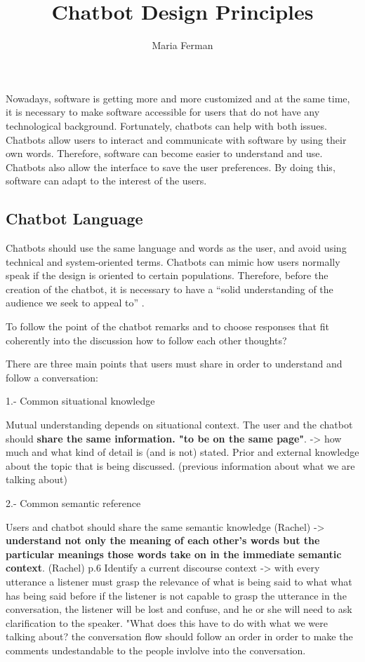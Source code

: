 \documentclass[a4paper,10pt]{article}
\title{Chatbot Design Principles}
\author{Maria Ferman}
\begin{document}
\maketitle

Nowadays, software is getting more and more customized and at the same time, it is necessary to make software accessible for users that do not have any technological background. Fortunately, chatbots can help with both issues. Chatbots allow users to interact and communicate with software by using their own words. Therefore, software can become easier to understand and use. Chatbots also allow the interface to save the user preferences. By doing this, software can adapt to the interest of the users.  

\subsection*{Chatbot Language}

Chatbots should use the same language and words as the user, and avoid using technical and system-oriented terms. Chatbots can mimic how users normally speak if the design is oriented to certain populations. Therefore, before the creation of the chatbot, it is necessary to have a ``solid understanding of the audience we seek to appeal to”  \cite{HeuristicsWebPage}. 

To follow the point of the chatbot remarks and to choose responses that fit coherently into the discussion 
how to follow each other thoughts?

There are three main points that users must share in order to understand and follow a conversation:

1.-  Common situational knowledge

Mutual understanding depends on situational context. The user and the chatbot should \textbf{share the same information. "to be on the same page"}. -> how much and what kind of detail is (and is not) stated.  Prior and external knowledge about the topic that is being discussed. (previous information about what we are talking about)  

2.-  Common semantic reference 

Users and chatbot should share the same semantic knowledge (Rachel) -> \textbf{understand not only the meaning of each other's words but the particular meanings those words take on in the immediate semantic context}. (Rachel)
p.6 Identify a current discourse context -> with every utterance a listener must grasp the relevance of what is being said to what what has being said before  
if the listener is not capable to grasp the utterance in the conversation, the listener will be lost and confuse, and he or she will need to ask clarification to the speaker. "What does this have to do with what we were talking about? 
the conversation flow should follow an order in order to make the comments undestandable to the people invlolve into the conversation. 
\end{document}
